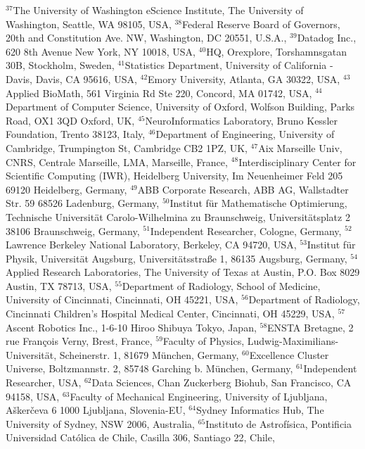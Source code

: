 $^{37}$The University of Washington eScience Institute, The University of Washington, Seattle, WA 98105, USA, 
$^{38}$Federal Reserve Board of Governors,  20th and Constitution Ave. NW, Washington, DC 20551, U.S.A., 
$^{39}$Datadog Inc., 620 8th Avenue New York, NY 10018, USA, 
$^{40}$HQ, Orexplore, Torshamnsgatan 30B, Stockholm, Sweden, 
$^{41}$Statistics Department, University of California - Davis, Davis, CA 95616, USA, 
$^{42}$Emory University, Atlanta, GA 30322, USA, 
$^{43}$Applied BioMath, 561 Virginia Rd Ste 220, Concord, MA 01742, USA, 
$^{44}$Department of Computer Science, University of Oxford, Wolfson Building, Parks Road, OX1 3QD Oxford, UK, 
$^{45}$NeuroInformatics Laboratory, Bruno Kessler Foundation, Trento 38123, Italy, 
$^{46}$Department of Engineering, University of Cambridge, Trumpington St, Cambridge CB2 1PZ, UK, 
$^{47}$Aix Marseille Univ, CNRS, Centrale Marseille, LMA, Marseille, France, 
$^{48}$Interdisciplinary Center for Scientific Computing (IWR), Heidelberg University, Im Neuenheimer Feld 205 69120 Heidelberg, Germany, 
$^{49}$ABB Corporate Research, ABB AG, Wallstadter Str. 59 68526 Ladenburg, Germany, 
$^{50}$Institut f\"ur Mathematische Optimierung, Technische Universit\"at Carolo-Wilhelmina zu Braunschweig, Universit\"atsplatz 2 38106 Braunschweig, Germany, 
$^{51}$Independent Researcher, Cologne, Germany, 
$^{52}$Lawrence Berkeley National Laboratory, Berkeley, CA 94720, USA, 
$^{53}$Institut f{\"u}r Physik, Universit{\"a}t Augsburg, Universit{\"a}tsstra{\ss}e 1, 86135 Augsburg, Germany, 
$^{54}$Applied Research Laboratories, The University of Texas at Austin, P.O. Box 8029 Austin, TX 78713, USA, 
$^{55}$Department of Radiology, School of Medicine, University of Cincinnati, Cincinnati, OH 45221, USA, 
$^{56}$Department of Radiology, Cincinnati Children's Hospital Medical Center, Cincinnati, OH 45229, USA, 
$^{57}$Ascent Robotics Inc., 1-6-10 Hiroo Shibuya Tokyo, Japan, 
$^{58}$ENSTA Bretagne, 2 rue François Verny, Brest, France, 
$^{59}$Faculty of Physics, Ludwig-Maximilians-Universit\"at, Scheinerstr. 1, 81679 M\"unchen, Germany, 
$^{60}$Excellence Cluster Universe, Boltzmannstr. 2, 85748 Garching b. M\"unchen, Germany, 
$^{61}$Independent Researcher, USA, 
$^{62}$Data Sciences, Chan Zuckerberg Biohub, San Francisco, CA 94158, USA, 
$^{63}$Faculty of Mechanical Engineering, University of Ljubljana, A\v{s}ker\v{c}eva 6 1000 Ljubljana, Slovenia-EU, 
$^{64}$Sydney Informatics Hub, The University of Sydney, NSW 2006, Australia, 
$^{65}$Instituto de Astrof\'{i}sica, Pontificia Universidad Cat\'{o}lica de Chile, Casilla 306, Santiago 22, Chile, 
